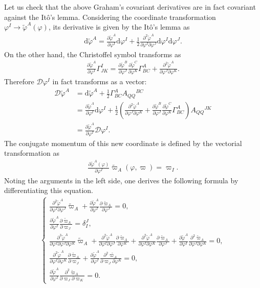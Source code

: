 \documentclass[aps, prd
, preprint
, nofootinbib 
, notitlepage
, longbibliography
]{revtex4-1}
\newcommand{\pdif}[2]{\frac{\partial #1}{\partial #2}}
\newcommand{\ppdpdpd}[3]{\frac{\partial^2 #1}{\partial #2\partial #3}}
\newcommand{\pppdpdpdpd}[4]{\frac{\partial^3 #1}{\partial #2\partial #3\partial #4}}
\newcommand{\dd}{\mathrm{d}}
\newcommand{\dps}{\displaystyle}
\newcommand{\calD}{\mathcal{D}}
\newcommand{\bae}[1]{\begin{align} #1 \end{align}}
\newcommand{\bce}[1]{\begin{cases} #1 \end{cases}}
\begin{document}
Let us check that the above Graham's covariant derivatives are in fact covariant against the It\^o's lemma.
Considering the coordinate transformation $\varphi^I\to\tilde{\varphi}^A(\varphi)$, its derivative is given by the It\^o's lemma as
\bae{
	\dd\tilde{\varphi}^A=\pdif{\tilde{\varphi}^A}{\varphi^I}\dd\varphi^I+\frac{1}{2}\frac{\partial^2\tilde{\varphi}^A}{\partial\varphi^I\partial\varphi^J}\dd\varphi^I\dd\varphi^J.
}
On the other hand, the Christoffel symbol transforms as
\bae{\label{eq: christoffel trs.}
	\pdif{\tilde{\varphi}^A}{\varphi^I}\Gamma^I_{JK}=\pdif{\tilde{\varphi}^B}{\varphi^J}\pdif{\tilde{\varphi}^C}{\varphi^K}\Gamma^A_{BC}
	+\frac{\partial^2\tilde{\varphi}^A}{\partial\varphi^J\partial\varphi^K}.
}
Therefore $\calD\varphi^I$ in fact transforms as a vector:
\bae{
	\calD\tilde{\varphi}^A&=\dd\tilde{\varphi}^A+\frac{1}{2}\Gamma^A_{BC}A_{QQ}{}^{BC} \nonumber \\
	&=\pdif{\tilde{\varphi}^A}{\varphi^I}\dd\varphi^I+\frac{1}{2}\left(\frac{\partial^2\tilde{\varphi}^A}{\partial\varphi^J\partial\varphi^K}
	+\pdif{\tilde{\varphi}^B}{\varphi^J}\pdif{\tilde{\varphi}^C}{\varphi^K}\Gamma^A_{BC}\right)A_{QQ}{}^{JK} \nonumber \\
	&=\pdif{\tilde{\varphi}^A}{\varphi^I}\calD\varphi^I.
}
The conjugate momentum of this new coordinate is defined by the vectorial transformation as
\bae{
	\pdif{\tilde{\varphi}^A(\varphi)}{\varphi^I}\tilde{\varpi}_A(\varphi,\varpi)=\varpi_I.
}
Noting the arguments in the left side, one derives the following formula by differentiating this equation.
\bae{
	\bce{
		\dps
		\ppdpdpd{\tilde{\varphi}^A}{\varphi^I}{\varphi^J}\tilde{\varpi}_A+\pdif{\tilde{\varphi}^A}{\varphi^I}\pdif{\tilde{\varpi}_A}{\varphi^J}=0, \\[10pt]
		\dps
		\pdif{\tilde{\varphi}^A}{\varphi^I}\pdif{\tilde{\varpi}_A}{\varpi_J}=\delta^J_I, \\[10pt]
		\dps
		\pppdpdpdpd{\tilde{\varphi}^A}{\varphi^I}{\varphi^J}{\varphi^K}\tilde{\varpi}_A+\ppdpdpd{\tilde{\varphi}^A}{\varphi^I}{\varphi^J}\pdif{\tilde{\varpi}_A}{\varphi^K}
		+\ppdpdpd{\tilde{\varphi}^A}{\varphi^I}{\varphi^K}\pdif{\tilde{\varpi}_A}{\varphi^J}+\pdif{\tilde{\varphi}^A}{\varphi^I}\ppdpdpd{\tilde{\varpi}_A}{\varphi^J}{\varphi^K}=0, \\[10pt]
		\dps
		\ppdpdpd{\tilde{\varphi}^A}{\varphi^I}{\varphi^K}\pdif{\tilde{\varpi}_A}{\varpi_J}+\pdif{\tilde{\varphi}^A}{\varphi^I}\ppdpdpd{\tilde{\varpi_A}}{\varpi_J}{\varphi^K}=0, \\[10pt]
		\dps
		\pdif{\tilde{\varphi}^A}{\varphi^I}\ppdpdpd{\tilde{\varpi}_A}{\varpi_J}{\varpi_K}=0.
	}
}
\end{document}
